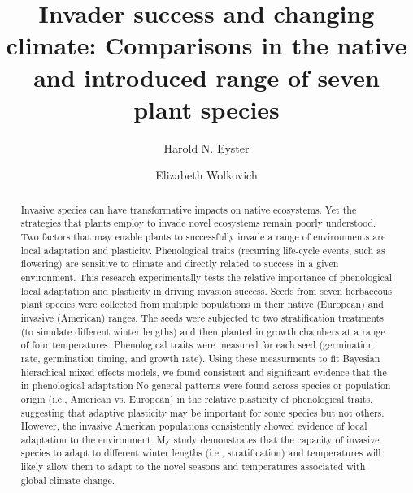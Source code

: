 \documentclass[12pt]{article}\usepackage[]{graphicx}\usepackage[]{color}
\title{Invader success and changing climate: Comparisons in the native and introduced range of seven plant species}
\author[1]{Harold N. Eyster}
\author[2]{Elizabeth Wolkovich}
\affil[1]{Institute for Resources, Environment, and Sustainability, University of British Columbia}
\affil[2]{Department of Forest and Conservation Science, University of British Columbia}
\date{}                     %
\begin{document}
\maketitle

\begin{spacing}{1} %
	\begin{abstract}
		Invasive species can have transformative impacts on native ecosystems. Yet the strategies that plants employ to invade novel ecosystems remain poorly understood.  Two factors that may enable plants to successfully invade a range of environments are local adaptation and plasticity. Phenological traits (recurring life-cycle events, such as flowering) are sensitive to climate and directly related to success in a given environment. This research experimentally tests the relative importance of phenological local adaptation and plasticity in driving invasion success. Seeds from seven herbaceous plant species were collected from multiple populations in their native (European) and invasive (American) ranges. The seeds were subjected to two stratification treatments (to simulate different winter lengths) and then planted in growth chambers at a range of  four temperatures. Phenological traits were measured for each seed (germination rate, germination timing, and growth rate). Using these measurments to  fit Bayesian hierachical mixed effects models, we found consistent and significant evidence that the in phenological adaptation  No general patterns were found across species or population origin (i.e., American vs. European) in the relative plasticity of phenological traits, suggesting that adaptive plasticity may be important for some species but not others. However, the invasive American populations consistently showed evidence of local adaptation to the environment. My study demonstrates that the capacity of invasive species to adapt to different winter lengths (i.e., stratification) and temperatures will likely allow them to adapt to the novel seasons and temperatures associated with global climate change.  
	\end{abstract}
\end{spacing}		
\end{document}

